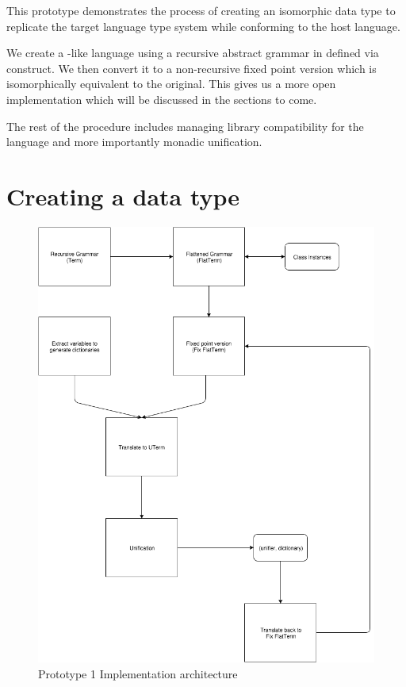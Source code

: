 \documentclass[thesis-solanki.tex]{subfiles}
\begin{document}
This prototype demonstrates the process of creating an isomorphic data type to replicate the target language type system while
conforming to the host language.

We create a -like language using a recursive abstract grammar in  defined via  
construct. We then convert it to a non-recursive fixed point version which is isomorphically equivalent to the original. This gives us a 
more open implementation which will be discussed in the sections to come.

The rest of the procedure includes managing library compatibility for the language and more importantly monadic unification. 

\section{Creating a data type}
\begin{figure}
  \includegraphics[width=1\textwidth]{prototype_1_implementation_architecture.png}
  \caption{Prototype 1 Implementation architecture}
  \label{fig:proto1-impl-arch}
\end{figure}
\end{document}
